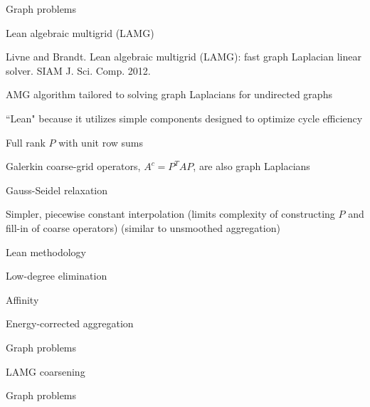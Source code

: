 \documentclass[18pt,xcolor=table]{beamer}
\begin{document}
\begin{frame}{Graph problems}
\begin{block}{Lean algebraic multigrid (LAMG)}
\bit
\item Livne and Brandt. Lean algebraic multigrid (LAMG): fast graph Laplacian linear solver. SIAM J. Sci. Comp. 2012.
\item AMG algorithm tailored to solving graph Laplacians for undirected graphs
\item ``Lean" because it utilizes simple components designed to optimize cycle efficiency
\bit
\item Full rank $P$ with unit row sums
\item Galerkin coarse-grid operators, $A^c = P^TAP$, are also graph Laplacians
\item Gauss-Seidel relaxation
\item Simpler, piecewise constant interpolation (limits complexity of constructing $P$ and fill-in of coarse operators) (similar to unsmoothed aggregation)
\item Lean methodology
\item Low-degree elimination
\item Affinity
\item Energy-corrected aggregation
\eit
\eit
\end{block}
\end{frame}

\begin{frame}{Graph problems}
\begin{block}{LAMG coarsening}
\bit
\item 
\eit
\end{block}
\end{frame}

\begin{frame}{Graph problems}
\begin{block}{}
\bit
\item 
\eit
\end{block}
\end{frame}



\end{document}
